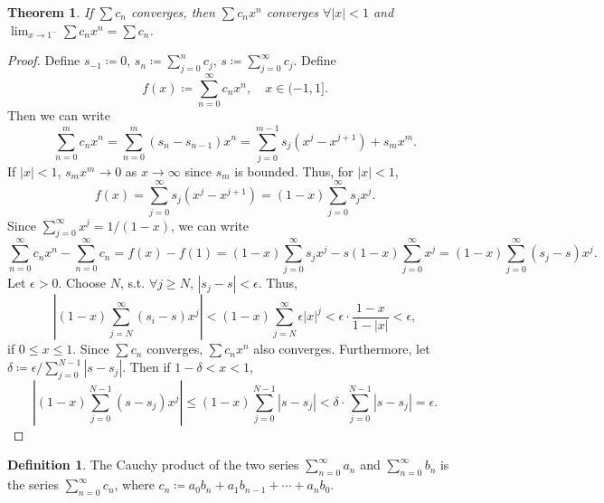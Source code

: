 \documentclass[12pt]{article}
\theoremstyle{plain}
\newtheorem{thm}{Theorem}
\theoremstyle{definition}
\newtheorem*{defn}{Definition}
\begin{document}
\begin{thm}
    If $\sum c_n$ converges, then $\sum c_n x^n$ converges $\forall |x|<1$ and $\lim_{x\rightarrow
    1^-}\sum c_n x^n = \sum c_n$.
\end{thm}
\begin{proof}
    Define $s_{-1}\coloneqq 0$, $s_n\coloneqq \sum_{j=0}^n c_j$, $s\coloneqq\sum_{j=0}^\infty c_j$.
    Define 
    $$f(x)\coloneqq \sum_{n=0}^{\infty} c_{n}x^n ,\quad x\in (-1,1].$$
    Then we can write
    $$\sum_{n=0}^m c_n x^n = \sum_{n=0}^m (s_n-s_{n-1})x^n
    =\sum_{j=0}^{m-1}s_j(x^j-x^{j+1})+s_mx^m.$$
    If $|x|<1$, $s_mx^m\rightarrow0$ as $x\rightarrow\infty$ since $s_m$ is bounded.
    Thus, for $|x|<1$,
    $$f(x)=\sum_{j=0}^\infty s_j(x^j - x^{j+1}) = (1-x)\sum_{j=0}^\infty s_j x^j.$$
    Since $\sum_{j=0}^\infty x^j = 1/(1-x)$, we can write
    $$\sum_{n=0}^\infty c_nx^n - \sum_{n=0}^\infty c_n = f(x)-f(1)=(1-x)\sum_{j=0}^\infty s_j x^j-
    s(1-x)\sum_{j=0}^\infty x^j=(1-x)\sum_{j=0}^\infty (s_j-s) x^j.$$
    Let $\epsilon>0$.
    Choose $N$, s.t. $\forall j\geq N$, $|s_j-s|<\epsilon$.
    Thus,
    $$\left|(1-x)\sum_{j=N}^\infty (s_i-s)x^j\right|
    <(1-x)\sum_{j=N}^\infty \epsilon |x|^j
    <\epsilon\cdot \frac{1-x}{1-|x|}<\epsilon,$$
    if $0\leq x\leq 1$.
    Since $\sum c_n$ converges, $\sum c_nx^n$ also converges.
    Furthermore, let $\delta\coloneqq\epsilon/\sum_{j=0}^{N-1}|s-s_j|$.
    Then if $1-\delta<x<1$,
    $$\left|(1-x)\sum_{j=0}^{N-1}(s-s_j)x^j\right|
    \leq (1-x)\sum_{j=0}^{N-1}|s-s_j|<\delta\cdot \sum_{j=0}^{N-1}|s-s_j|= \epsilon.$$
\end{proof}

\begin{defn}
    The Cauchy product of the two series $\sum_{n=0}^\infty a_n$ and $\sum_{n=0}^\infty b_n$ is the
    series $\sum_{n=0}^\infty c_n$, where $c_n\coloneqq a_0b_n+a_1b_{n-1}+\cdots + a_nb_0$.
\end{defn}
\end{document}
